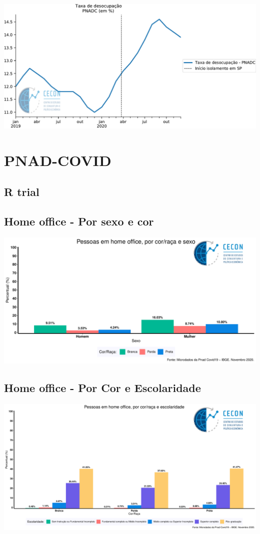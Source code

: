 \documentclass{SelfArx}
\begin{document}
\begin{center}
\includegraphics[width=.9\linewidth]{./figs/Emprego/TaxaDesocupacao.pdf}
\end{center}

\section*{PNAD-COVID}
\label{sec:orgaff8a03}
\subsection*{R trial}
\label{sec:org2c2ea83}
\subsection*{Home office - Por sexo e cor}
\label{sec:org5e5da2a}




\begin{center}
\includegraphics[width=.9\linewidth]{./figs/PNAD_COVID/home_sexo_cor.pdf}
\end{center}

\subsection*{Home office - Por Cor e Escolaridade}
\label{sec:org1e2c231}
\begin{center}
\includegraphics[width=.9\linewidth]{./figs/PNAD_COVID/home_edu_cor.pdf}
\end{center}
\end{document}
